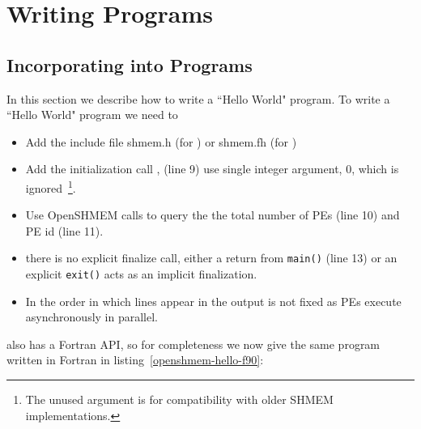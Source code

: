 \section{Writing \openshmem{} Programs}

\subsection*{Incorporating \openshmem{} into Programs}

In this section we describe how to write a ``Hello World" \openshmem program.
To write a ``Hello World" \openshmem program we need to 

\begin{itemize}
\item Add the include file shmem.h (for \Clang) or shmem.fh (for \Fortran)
\item Add the initialization call , (line 9) use
  single integer argument, 0, which is ignored~\footnote{The unused
    argument is for compatibility with older SHMEM implementations.}.
\item Use OpenSHMEM calls to query the the total number of PEs (line 10) and PE id (line 11).
\item there is no explicit finalize call, either a return from
  \texttt{main()} (line 13) or an explicit \texttt{exit()} acts as an
  implicit \openshmem finalization.
\item In \openshmem the order in which lines appear
  in the output is not fixed as \ac{PE}s execute asynchronously in parallel.
\end{itemize}

\begin{minipage}{\linewidth}
\vspace{0.1in}
\vspace{0.1in}
\end{minipage}

\openshmem also has a Fortran API, so for completeness we now give the
same program written in Fortran in listing~\ref{openshmem-hello-f90}:

\begin{minipage}{\linewidth}
\vspace{0.1in}
\vspace{0.1in}
\end{minipage}

